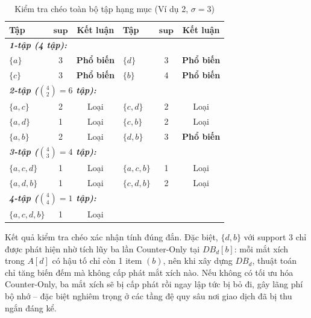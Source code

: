 \documentclass[12pt,a4paper]{report}
\begin{document}
\begin{table}[H]
  \centering
  \caption{Kiểm tra chéo toàn bộ tập hạng mục (Ví dụ 2, $\sigma = 3$)}
  \label{tab:ex2-crosscheck}
  \begin{tabular}{lcc@{\hskip 1.5em}lcc}
    \toprule
    \textbf{Tập} & $\mathbf{sup}$ & \textbf{Kết luận}
      & \textbf{Tập} & $\mathbf{sup}$ & \textbf{Kết luận} \\
    \midrule
    \multicolumn{6}{l}{\textit{\textbf{1-tập (4 tập):}}} \\
    $\{a\}$   & 3 & {\textbf{Phổ biến}} & $\{d\}$   & 3 & {\textbf{Phổ biến}} \\
    $\{c\}$   & 3 & {\textbf{Phổ biến}} & $\{b\}$   & 4 & {\textbf{Phổ biến}} \\
    \midrule
    \multicolumn{6}{l}{\textit{\textbf{2-tập ($\binom{4}{2} = 6$ tập):}}} \\
    $\{a,c\}$  & 2 & {Loại} & $\{c,d\}$  & 2 & {Loại} \\
    $\{a,d\}$  & 1 & {Loại} & $\{c,b\}$  & 2 & {Loại} \\
    $\{a,b\}$  & 2 & {Loại} & $\{d,b\}$  & 3 & {\textbf{Phổ biến}} \\
    \midrule
    \multicolumn{6}{l}{\textit{\textbf{3-tập ($\binom{4}{3} = 4$ tập):}}} \\
    $\{a,c,d\}$  & 1 & {Loại}   & $\{a,c,b\}$  & 1 & {Loại} \\
    $\{a,d,b\}$  & 1 & {Loại}   & $\{c,d,b\}$  & 2 & {Loại} \\
    \midrule
    \multicolumn{6}{l}{\textit{\textbf{4-tập ($\binom{4}{4} = 1$ tập):}}} \\
    $\{a,c,d,b\}$ & 1 & {Loại} &               &   &  \\
    \bottomrule
  \end{tabular}
\end{table}
 
Kết quả kiểm tra chéo xác nhận tính đúng đắn. Đặc biệt, $\{d,b\}$ với support 3
chỉ được phát hiện nhờ tích lũy ba lần Counter-Only tại $\mathit{DB}_d[b]$:
mỗi mắt xích trong $A[d]$ có hậu tố chỉ còn 1 item $(b)$, nên khi xây dựng
$\mathit{DB}_d$, thuật toán chỉ tăng biến đếm mà không cấp phát mắt xích nào.
Nếu không có tối ưu hóa Counter-Only, ba mắt xích sẽ bị cấp phát rồi ngay lập tức
bị bỏ đi, gây lãng phí bộ nhớ -- đặc biệt nghiêm trọng ở các tầng đệ quy sâu
nơi giao dịch đã bị thu ngắn đáng kể.
 

\end{document}
